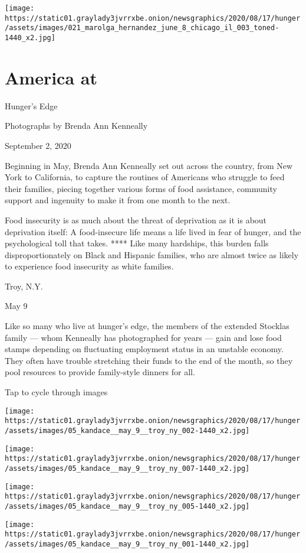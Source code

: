 \texttt{[image: https://static01.graylady3jvrrxbe.onion/newsgraphics/2020/08/17/hunger/assets/images/021\_marolga\_hernandez\_june\_8\_chicago\_il\_003\_toned-1440\_x2.jpg]}

\hypertarget{america-at}{%
\section{America at}\label{america-at}}

Hunger's Edge

Photographs by Brenda Ann Kenneally

September 2, 2020

Beginning in May, Brenda Ann Kenneally set out across the country, from
New York to California, to capture the routines of Americans who
struggle to feed their families, piecing together various forms of food
assistance, community support and ingenuity to make it from one month to
the next.

Food insecurity is as much about the threat of deprivation as it is
about deprivation itself: A food-insecure life means a life lived in
fear of hunger, and the psychological toll that takes. **** Like many
hardships, this burden falls disproportionately on Black and Hispanic
families, who are almost twice as likely to experience food insecurity
as white families.

Troy, N.Y.

May 9

Like so many who live at hunger's edge, the members of the extended
Stocklas family --- whom Kenneally has photographed for years --- gain
and lose food stamps depending on fluctuating employment status in an
unstable economy. They often have trouble stretching their funds to the
end of the month, so they pool resources to provide family-style dinners
for all.

Tap to cycle through images

\texttt{[image: https://static01.graylady3jvrrxbe.onion/newsgraphics/2020/08/17/hunger/assets/images/05\_kandace\_\_may\_9\_\_troy\_ny\_002-1440\_x2.jpg]}

\texttt{[image: https://static01.graylady3jvrrxbe.onion/newsgraphics/2020/08/17/hunger/assets/images/05\_kandace\_\_may\_9\_\_troy\_ny\_007-1440\_x2.jpg]}

\texttt{[image: https://static01.graylady3jvrrxbe.onion/newsgraphics/2020/08/17/hunger/assets/images/05\_kandace\_\_may\_9\_\_troy\_ny\_005-1440\_x2.jpg]}

\texttt{[image: https://static01.graylady3jvrrxbe.onion/newsgraphics/2020/08/17/hunger/assets/images/05\_kandace\_\_may\_9\_\_troy\_ny\_001-1440\_x2.jpg]}

